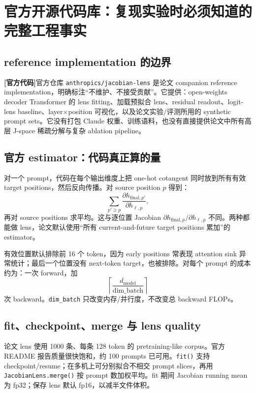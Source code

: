 \documentclass[10.5pt,a4paper]{ctexart}
\newcommand{\CodeTag}{\textbf{[官方代码]}}
\begin{document}
\section{官方开源代码库：复现实验时必须知道的完整工程事实}

\subsection{reference implementation 的边界}
\CodeTag 官方仓库 \texttt{anthropics/jacobian-lens} 是论文 companion reference implementation，明确标注“不维护、不接受贡献”。它提供：open-weights decoder Transformer 的 lens fitting、加载预拟合 lens、residual readout、logit-lens baseline、layer$\times$position 可视化，以及论文实验/评测所用的 synthetic prompt sets。它没有打包 Claude 权重、训练语料，也没有直接提供论文中所有高层 J-space 稀疏分解与复杂 ablation pipeline。

\subsection{官方 estimator：代码真正算的量}
对一个 prompt，代码在每个输出维度上把 one-hot cotangent 同时放到所有有效 target positions，然后反向传播。对 source position $p$ 得到：
\[
\sum_{p'\ge p}
\frac{\partial h_{\mathrm{final},p'}}{\partial h_{\ell,p}},
\]
再对 source positions 求平均。这与逐位置 Jacobian
\(
\partial h_{\mathrm{final},p}/\partial h_{\ell,p}
\)
不同。两种都能做 lens，论文默认使用“所有 current-and-future target positions 累加”的 estimator。

有效位置默认排除前 16 个 token，因为 early positions 常表现 attention sink 异常统计；最后一个位置没有 next-token target，也被排除。对每个 prompt 的成本约为：一次 forward，加
\[
\left\lceil\frac{d_{\mathrm{model}}}{\mathrm{dim\_batch}}\right\rceil
\]
次 backward。\texttt{dim\_batch} 只改变内存/并行度，不改变总 backward FLOPs。

\subsection{fit、checkpoint、merge 与 lens quality}
论文 lens 使用 1000 条、每条 128 token 的 pretraining-like corpus。官方 README 报告质量很快饱和，约 100 prompts 已可用。\texttt{fit()} 支持 checkpoint/resume；在多机上可分别拟合不相交 prompt slices，再用 \texttt{JacobianLens.merge()} 按 prompt 数加权平均。fit 期间 Jacobian running mean 为 fp32；保存 lens 默认 fp16，以减半文件体积。
\end{document}
